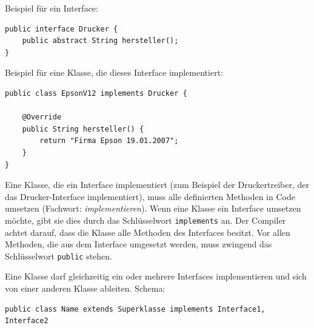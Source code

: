 Beispiel für ein Interface:

\begin{lstlisting}
public interface Drucker {
    public abstract String hersteller();
}
\end{lstlisting}
   
Beispiel für eine Klasse, die dieses Interface implementiert:

\begin{lstlisting}
public class EpsonV12 implements Drucker {

    @Override
    public String hersteller() {
        return "Firma Epson 19.01.2007";
    }
}
\end{lstlisting}

Eine Klasse, die ein Interface implementiert (zum Beispiel der Druckertreiber,
der das Drucker-Interface implementiert), muss alle definierten Methoden in
Code umsetzen (Fachwort: \emph{implementieren}). Wenn eine Klasse ein Interface
umsetzen möchte, gibt sie dies durch das Schlüsselwort \lstinline|implements|
an. Der Compiler achtet darauf, dass die Klasse alle Methoden des Interfaces
besitzt. Vor allen Methoden, die aus dem Interface umgesetzt werden, muss
zwingend das Schlüsselwort \lstinline|public| stehen.

Eine Klasse darf gleichzeitig ein oder mehrere Interfaces implementieren und
sich von einer anderen Klasse ableiten. Schema:

\begin{lstlisting}
public class Name extends Superklasse implements Interface1, Interface2
\end{lstlisting}

